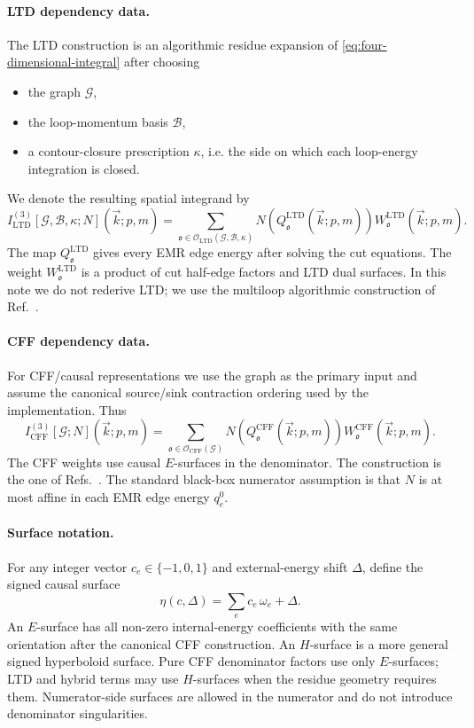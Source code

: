 \documentclass[11pt,a4paper]{report}
\newcommand{\LTD}{\operatorname{LTD}}
\newcommand{\CFF}{\operatorname{CFF}}
\newcommand{\Graph}{\mathcal G}
\newcommand{\Basis}{\mathcal B}
\newcommand{\Orient}{\mathcal O}
\begin{document}
\paragraph{LTD dependency data.}
The LTD construction is an algorithmic residue expansion of
\eqref{eq:four-dimensional-integral} after choosing
\begin{itemize}[leftmargin=2em]
  \item the graph \(\Graph\),
  \item the loop-momentum basis \(\Basis\),
  \item a contour-closure prescription \(\kappa\), i.e. the side on which each
        loop-energy integration is closed.
\end{itemize}
We denote the resulting spatial integrand by
\begin{equation}
  I^{(3)}_{\LTD}[\Graph,\Basis,\kappa;N](\vec k;p,m)
  =
  \sum_{\mathfrak o\in\Orient_{\LTD}(\Graph,\Basis,\kappa)}
  N\!\left(Q_{\mathfrak o}^{\LTD}(\vec k;p,m)\right)
  W_{\mathfrak o}^{\LTD}(\vec k;p,m).
\end{equation}
The map \(Q_{\mathfrak o}^{\LTD}\) gives every EMR edge energy after solving
the cut equations.  The weight \(W_{\mathfrak o}^{\LTD}\) is a product of
cut half-edge factors and LTD dual surfaces.  In this note we do not rederive
LTD; we use the multiloop algorithmic construction of
Ref.~\cite{ltd1906}.

\paragraph{CFF dependency data.}
For CFF/causal representations we use the graph as the primary input and assume
the canonical source/sink contraction ordering used by the implementation.
Thus
\begin{equation}
  I^{(3)}_{\CFF}[\Graph;N](\vec k;p,m)
  =
  \sum_{\mathfrak o\in\Orient_{\CFF}(\Graph)}
  N\!\left(Q_{\mathfrak o}^{\CFF}(\vec k;p,m)\right)
  W_{\mathfrak o}^{\CFF}(\vec k;p,m).
\end{equation}
The CFF weights use causal \(E\)-surfaces in the denominator.  The construction
is the one of Refs.~\cite{cff2211,cff2311}.  The standard black-box numerator
assumption is that \(N\) is at most affine in each EMR edge energy \(q_e^0\).

\paragraph{Surface notation.}
For any integer vector \(c_e\in\{-1,0,1\}\) and external-energy shift
\(\Delta\), define the signed causal surface
\begin{equation}
  \eta(c,\Delta)=\sum_{e}c_e\,\omega_e+\Delta .
\end{equation}
An \(E\)-surface has all non-zero internal-energy coefficients with the same
orientation after the canonical CFF construction.  An \(H\)-surface is a more
general signed hyperboloid surface.  Pure CFF denominator factors use only
\(E\)-surfaces; LTD and hybrid terms may use \(H\)-surfaces when the residue
geometry requires them.  Numerator-side surfaces are allowed in the numerator
and do not introduce denominator singularities.
\end{document}
